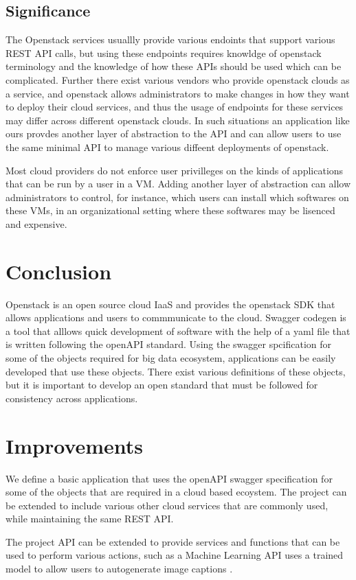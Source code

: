 \subsection{Significance}
The Openstack services usuallly provide various endoints that support
various REST API calls, but using these endpoints requires knowldge of
openstack terminology and the knowledge of how these APIs should be
used which can be complicated. Further there exist various vendors who
provide openstack clouds as a service, and openstack allows
administrators to make changes in how they want to deploy their cloud
services, and thus the usage of endpoints for these services may
differ across different openstack clouds. In such situations an
application like ours provdes another layer of abstraction to the API
and can allow users to use the same minimal API to manage various
diffeent deployments of openstack.

Most cloud providers do not enforce user privilleges on the
kinds of applications that can be run by a user in a VM. Adding
another layer of abstraction can allow administrators to control, for
instance, which users can install which softwares on these VMs, in an
organizational setting where these softwares may be lisenced and
expensive.

\section{Conclusion}
Openstack is an open source cloud IaaS and provides the openstack SDK
that allows applications and users to commmunicate to the
cloud. Swagger codegen is a tool that alllows quick development of
software with the help of a yaml file that is written following the
openAPI standard. Using the swagger spcification for some of the
objects required for big data ecosystem, applications can be easily
developed that use these objects. There exist various definitions of
these objects, but it is important to develop an open standard that
must be followed for consistency across applications.

\section{Improvements}
We define a basic application that uses the openAPI swagger specification
for some of the objects that are required in a cloud based
ecoystem. The project can be extended to include various other cloud services
that are commonly used, while maintaining the same REST API.

The project API can be extended to provide services and functions that
can be used to perform various actions, such as a Machine Learning API uses a
trained model to allow users to autogenerate image captions
\cite{hid-sp18-503-image-cap}.

 
